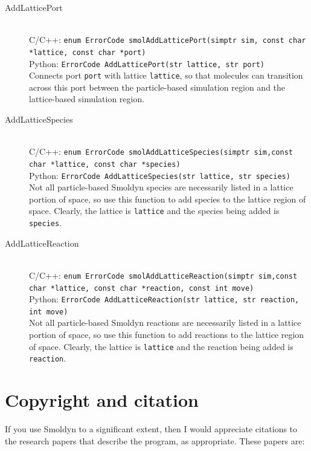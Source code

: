 \documentclass {book}
\newcommand {\ttt} {\texttt}
\begin{document}
\begin{description}
\item[AddLatticePort]
\hfill \\
C/C++: \ttt{enum ErrorCode smolAddLatticePort(simptr sim, const char *lattice, const char *port)}\\
Python: \ttt{ErrorCode AddLatticePort(str lattice, str port)}\\
Connects port \ttt{port} with lattice \ttt{lattice}, so that molecules can transition across this port between the particle-based simulation region and the lattice-based simulation region.

\item[AddLatticeSpecies]
\hfill \\
C/C++: \ttt{enum ErrorCode smolAddLatticeSpecies(simptr sim,const char *lattice, const char *species)}\\
Python: \ttt{ErrorCode AddLatticeSpecies(str lattice, str species)}\\
Not all particle-based Smoldyn species are necessarily listed in a lattice portion of space, so use this function to add species to the lattice region of space. Clearly, the lattice is \ttt{lattice} and the species being added is \ttt{species}.

\item[AddLatticeReaction]
\hfill \\
C/C++: \ttt{enum ErrorCode smolAddLatticeReaction(simptr sim,const char *lattice, const char *reaction, const int move)}\\
Python: \ttt{ErrorCode AddLatticeReaction(str lattice, str reaction, int move)}\\
Not all particle-based Smoldyn reactions are necessarily listed in a lattice portion of space, so use this function to add reactions to the lattice region of space. Clearly, the lattice is \ttt{lattice} and the reaction being added is \ttt{reaction}.

\end{description}


\chapter{Copyright and citation}

If you use Smoldyn to a significant extent, then I would appreciate citations to the research papers that describe the program, as appropriate. These papers are:
\end{document}
